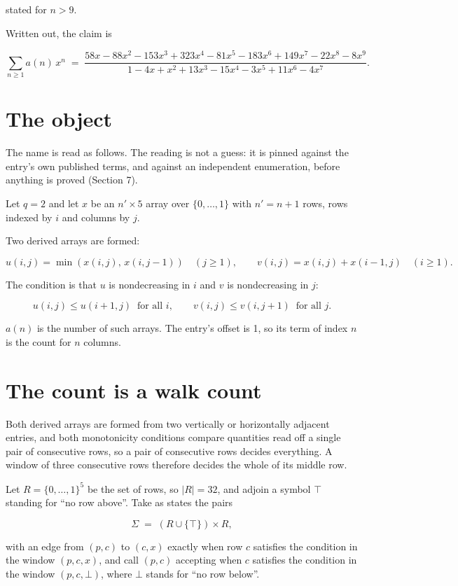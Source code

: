\documentclass[11pt]{article}
\theoremstyle{definition}
\begin{document}
stated for $n > 9$.

Written out, the claim is

\[\sum_{n \ge 1} a(n)\,x^n \;=\; \frac{58x - 88x^{2} - 153x^{3} + 323x^{4} - 81x^{5} - 183x^{6} + 149x^{7} - 22x^{8} - 8x^{9}}{1 - 4x + x^{2} + 13x^{3} - 15x^{4} - 3x^{5} + 11x^{6} - 4x^{7}}.\]

\section{The object}

The name is read as follows. The reading is not a guess: it is pinned against the entry's own published terms, and against an independent enumeration, before anything is proved (Section 7).

Let $q = 2$ and let $x$ be an $n' \times 5$ array over $\{0,\dots,1\}$ with $n' = n + 1$ rows, rows indexed by $i$ and columns by $j$.

Two derived arrays are formed:

\[u(i,j) = \min(x(i,j),\,x(i,j{-}1))\quad (j \ge 1), \qquad v(i,j) = x(i,j) + x(i{-}1,j)\quad (i \ge 1).\]

The condition is that $u$ is nondecreasing in $i$ and $v$ is nondecreasing in $j$:

\[u(i,j) \le u(i{+}1,j) \ \text{ for all } i, \qquad v(i,j) \le v(i,j{+}1) \ \text{ for all } j.\]

$a(n)$ is the number of such arrays. The entry's offset is 1, so its term of index $n$ is the count for $n$ columns.

\section{The count is a walk count}

Both derived arrays are formed from two vertically or horizontally adjacent entries, and both monotonicity conditions compare quantities read off a single pair of consecutive rows, so a pair of consecutive rows decides everything. A window of three consecutive rows therefore decides the whole of its middle row.

Let $R = \{0,\dots,1\}^{5}$ be the set of rows, so $|R| = 32$, and adjoin a symbol $\top$ standing for ``no row above''. Take as states the pairs

\[\Sigma \;=\; (R \cup \{\top\}) \times R,\]

with an edge from $(p,c)$ to $(c,x)$ exactly when row $c$ satisfies the condition in the window $(p,c,x)$, and call $(p,c)$ accepting when $c$ satisfies the condition in the window $(p,c,\bot)$, where $\bot$ stands for ``no row below''.
\end{document}
